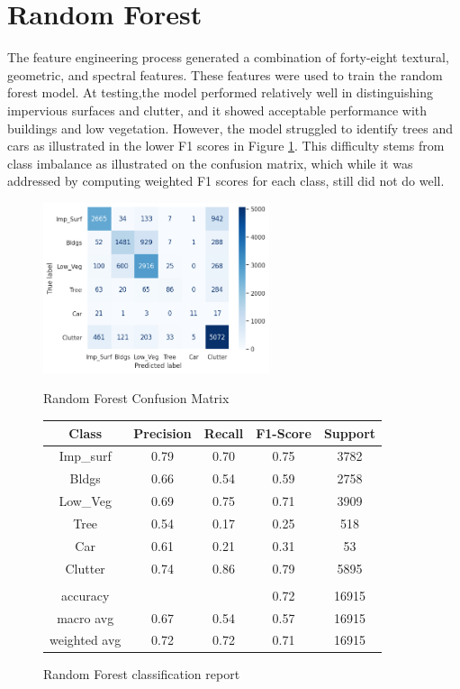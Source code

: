 \section{Random Forest}
The feature engineering process generated a combination of forty-eight textural, geometric, and spectral features. These features were used to train the random forest model. At testing,the model performed relatively well in distinguishing impervious surfaces and clutter, and it showed acceptable performance with buildings and low vegetation. However, the model struggled to identify trees and cars as illustrated in the lower F1 scores in Figure \ref{tab:RF_F1}. This difficulty stems from class imbalance as illustrated on the confusion matrix, which while it was addressed by computing weighted F1 scores for each class, still did not do well. 
\begin{figure}[h]
    \centering
    \begin{minipage}[b]{0.45\linewidth}
        \centering
        \includegraphics[height=5cm]{images/RF Confusion matrix.png} %
        \caption{Random Forest Confusion Matrix}
        \label{fig:RF_CM}
    \end{minipage}
    \begin{minipage}[b]{0.45\linewidth}
        \centering
        \begin{tabular}{c|c|c|c|c}
        \hline
             Class & Precision & Recall & F1-Score & Support \\
             \hline
             Imp\_surf & 0.79 & 0.70 & 0.75 & 3782 \\
             Bldgs & 0.66 & 0.54 & 0.59 & 2758 \\
             Low\_Veg & 0.69 & 0.75 & 0.71 & 3909 \\
             Tree & 0.54 & 0.17 & 0.25 & 518 \\
             Car & 0.61 & 0.21 & 0.31 & 53 \\
             Clutter & 0.74 & 0.86 & 0.79 & 5895 \\
             \hline
             & & & & \\
             accuracy & & & 0.72 & 16915 \\
             macro avg & 0.67 & 0.54 & 0.57 & 16915 \\
             weighted avg & 0.72 & 0.72 & 0.71 & 16915 \\
        \end{tabular}
        \caption{Random Forest classification report}
        \label{tab:RF_F1}
    \end{minipage}
\end{figure}

